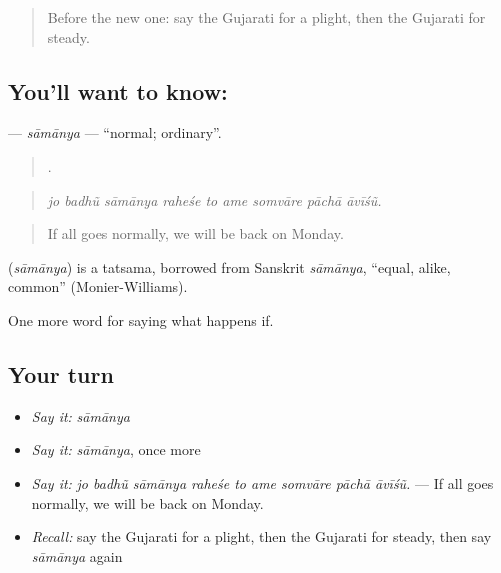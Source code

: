\label{lesson:GU-C377-samanya}



\begin{quote}
Before the new one: say the Gujarati for a plight, then the Gujarati for steady.
\end{quote}

\subsection*{You'll want to know: }
\textbf{} — \emph{sāmānya} — \textquotedblleft{}normal; ordinary\textquotedblright{}.

\begin{quote}
        .
\end{quote}

\begin{quote}
\emph{jo badhũ sāmānya raheśe to ame somvāre pāchā āvīśũ.}
\end{quote}

\begin{quote}
If all goes normally, we will be back on Monday.
\end{quote}

\begin{cousinweb}
\textbf{} (\emph{sāmānya}) is a tatsama, borrowed from Sanskrit \emph{sāmānya}, \textquotedblleft{}equal, alike, common\textquotedblright{} (Monier-Williams).
\end{cousinweb}

\begin{grammarlens}[title={What you've built}]
One more word for saying what happens if.
\end{grammarlens}

\subsection*{Your turn}
\begin{itemize}
\raggedright
  \item \emph{Say it:} \emph{sāmānya}
  \item \emph{Say it:} \emph{sāmānya}, once more
  \item \emph{Say it:} \emph{jo badhũ sāmānya raheśe to ame somvāre pāchā āvīśũ.} — If all goes normally, we will be back on Monday.
  \item \emph{Recall:} say the Gujarati for a plight, then the Gujarati for steady, then say \emph{sāmānya} again
\end{itemize}

